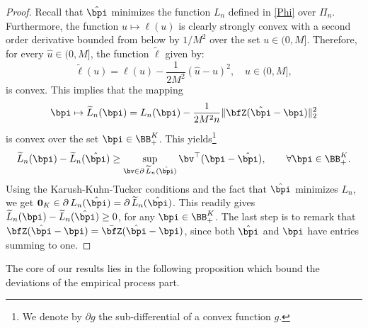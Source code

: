 \begin{proof}
Recall that $\hat\bpi$ minimizes the function $L_n$ defined in \eqref{Phi} over $\Pi_n$. Furthermore,
the function $u\mapsto \ell(u)$ is clearly strongly convex with a second order derivative bounded from below
by $1/M^2$ over the set $u\in(0,M]$. Therefore, for every $\hat u\in(0,M]$, the function $\widetilde{\ell}$ given by:
\begin{equation}
    \widetilde{\ell}(u)=\ell(u)-\frac{1}{2M^2}(\hat{u}-u)^2,\quad u\in(0,M],
\end{equation}
is convex.
This implies that the mapping
\begin{equation}
\bpi\mapsto \widetilde L_n(\bpi) = L_n(\bpi)-\frac1{2 M^2 n}\|\bfZ(\hat\bpi-\bpi)\|_2^2
\end{equation}
is convex over the set $\bpi\in \BB^K_+$. This yields\footnote{We denote by $\partial g$ the sub-differential of a convex function $g$.}
\begin{equation}
\widetilde L_n(\bpi) -\widetilde L_n(\hat\bpi) \ge \sup_{\bv\in \partial\, \widetilde L_n(\hat\bpi)}\bv^\top (\bpi-\hat\bpi) ,\qquad \forall\bpi\in\BB^K_+.
\end{equation}
Using the Karush-Kuhn-Tucker conditions and the fact that $\hat\bpi$ minimizes $L_n$, we 
get $\mathbf 0_K\in \partial\,L_n(\hat\bpi) = \partial\,\widetilde L_n(\hat\bpi)$. This 
readily gives $\widetilde L_n(\bpi) -\widetilde L_n(\hat\bpi)\ge 0$, for any $\bpi\in\BB^K_+$. 
The last step is to remark that $\bfZ(\hat\bpi-\bpi) = \bar\bfZ(\hat\bpi-\bpi)$, since both
$\hat\bpi$ and $\bpi$ have entries summing to one.
\end{proof}

The core of our results lies in the following proposition which bound the deviations of the empirical process part.

